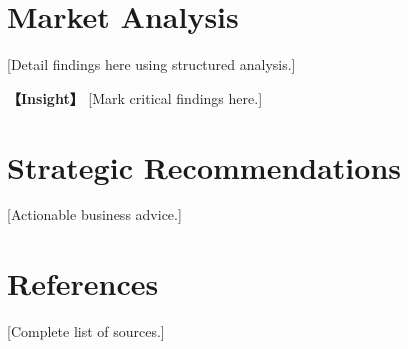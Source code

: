 \documentclass[12pt,a4paper]{article}
\newcommand{\insight}[1]{\noindent\textbf{【Insight】} #1}
\begin{document}
\section{Market Analysis}
[Detail findings here using structured analysis.]

\insight{[Mark critical findings here.]}

\section{Strategic Recommendations}
[Actionable business advice.]

\section{References}
[Complete list of sources.]
\end{document}
